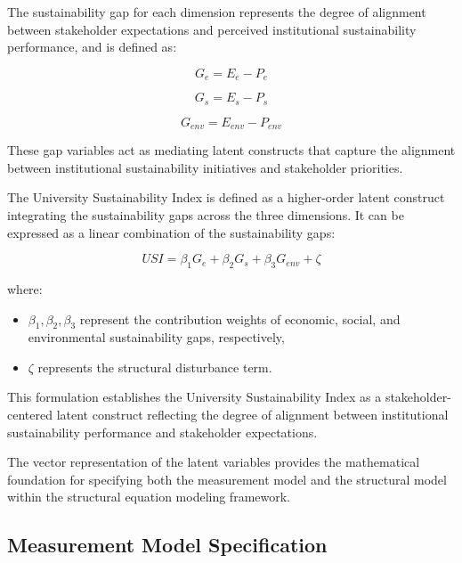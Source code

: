 \documentclass[11pt,a4paper]{article}
\begin{document}
The sustainability gap for each dimension represents the degree of alignment between stakeholder expectations and perceived institutional sustainability performance, and is defined as:

\begin{equation}
G_e = E_e - P_e
\end{equation}

\begin{equation}
G_s = E_s - P_s
\end{equation}

\begin{equation}
G_{env} = E_{env} - P_{env}
\end{equation}

These gap variables act as mediating latent constructs that capture the alignment between institutional sustainability initiatives and stakeholder priorities.

The University Sustainability Index is defined as a higher-order latent construct integrating the sustainability gaps across the three dimensions. It can be expressed as a linear combination of the sustainability gaps:

\begin{equation}
USI = \beta_1 G_e + \beta_2 G_s + \beta_3 G_{env} + \zeta
\end{equation}

where:

\begin{itemize}
\item $\beta_1, \beta_2, \beta_3$ represent the contribution weights of economic, social, and environmental sustainability gaps, respectively,
\item $\zeta$ represents the structural disturbance term.
\end{itemize}

This formulation establishes the University Sustainability Index as a stakeholder-centered latent construct reflecting the degree of alignment between institutional sustainability performance and stakeholder expectations.

The vector representation of the latent variables provides the mathematical foundation for specifying both the measurement model and the structural model within the structural equation modeling framework.



\subsection{Measurement Model Specification}
\end{document}
